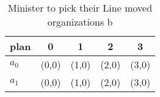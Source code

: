 \documentclass[a4paper]{article}
\begin{document}
\begin{table}
\begin{adjustbox}{width=0.8\columnwidth}
\begin{tabular}{|l|l|l|l|l|}
\hline
\textbf{plan} & \multicolumn{1}{c|}{\textbf{0}} & \multicolumn{1}{c|}{\textbf{1}} & \multicolumn{1}{c|}{\textbf{2}} & \multicolumn{1}{c|}{\textbf{3}} \\ \hline
\textbf{$a_0$}  & (0,0) & (1,0) & (2,0) & (3,0) \\ \hline
\textbf{$a_1$}  & (0,0) & (1,0) & (2,0) & (3,0) \\ \hline
\end{tabular}
\end{adjustbox}
\caption{Minister to pick their Line moved organizations b
}
\end{table}
\end{document}
